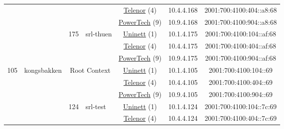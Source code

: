 \begin{small}
\begin{center}
\begin{longtable}{|c|c|c|c|c|c|c|c|}
  &  &  &  & \multicolumn{2}{|c|}{\tiny{\href{https://www.telenor.no}{Telenor} (4)}} & \tiny{10.4.4.168} & \tiny{2001:700:4100:404::a8:68} \\* \cline{5-5}\cline{6-6}\cline{7-7}\cline{8-8}
  &  &  &  & \multicolumn{2}{|c|}{\tiny{\href{http://www.powertech.no}{PowerTech} (9)}} & \tiny{10.9.4.168} & \tiny{2001:700:4100:904::a8:68} \\* \cline{3-3}\cline{4-4}\cline{5-5}\cline{6-6}\cline{7-7}\cline{8-8}
  &  & \multirow{3}{*}{\tiny{175}} & \multicolumn{1}{|l|}{\multirow{3}{*}{\tiny{srl-thuen}}} & \multicolumn{2}{|c|}{\tiny{\href{https://www.uninett.no}{Uninett} (1)}} & \tiny{10.1.4.175} & \tiny{2001:700:4100:104::af:68} \\* \cline{5-5}\cline{6-6}\cline{7-7}\cline{8-8}
  &  &  &  & \multicolumn{2}{|c|}{\tiny{\href{https://www.telenor.no}{Telenor} (4)}} & \tiny{10.4.4.175} & \tiny{2001:700:4100:404::af:68} \\* \cline{5-5}\cline{6-6}\cline{7-7}\cline{8-8}
  &  &  &  & \multicolumn{2}{|c|}{\tiny{\href{http://www.powertech.no}{PowerTech} (9)}} & \tiny{10.9.4.175} & \tiny{2001:700:4100:904::af:68} \\ \hline
 \multirow{21}{*}{\tiny{105}} & \multicolumn{1}{|l|}{\multirow{21}{*}{\tiny{kongsbakken}}} & \multicolumn{2}{|c|}{\multirow{3}{*}{\tiny{Root Context}}} & \multicolumn{2}{|c|}{\tiny{\href{https://www.uninett.no}{Uninett} (1)}} & \tiny{10.1.4.105} & \tiny{2001:700:4100:104::69} \\* \cline{5-5}\cline{6-6}\cline{7-7}\cline{8-8}
  &  & \multicolumn{2}{|c|}{} & \multicolumn{2}{|c|}{\tiny{\href{https://www.telenor.no}{Telenor} (4)}} & \tiny{10.4.4.105} & \tiny{2001:700:4100:404::69} \\* \cline{5-5}\cline{6-6}\cline{7-7}\cline{8-8}
  &  & \multicolumn{2}{|c|}{} & \multicolumn{2}{|c|}{\tiny{\href{http://www.powertech.no}{PowerTech} (9)}} & \tiny{10.9.4.105} & \tiny{2001:700:4100:904::69} \\* \cline{3-3}\cline{4-4}\cline{5-5}\cline{6-6}\cline{7-7}\cline{8-8}
  &  & \multirow{3}{*}{\tiny{124}} & \multicolumn{1}{|l|}{\multirow{3}{*}{\tiny{srl-test}}} & \multicolumn{2}{|c|}{\tiny{\href{https://www.uninett.no}{Uninett} (1)}} & \tiny{10.1.4.124} & \tiny{2001:700:4100:104::7c:69} \\* \cline{5-5}\cline{6-6}\cline{7-7}\cline{8-8}
  &  &  &  & \multicolumn{2}{|c|}{\tiny{\href{https://www.telenor.no}{Telenor} (4)}} & \tiny{10.4.4.124} & \tiny{2001:700:4100:404::7c:69} \\* \cline{5-5}\cline{6-6}\cline{7-7}\cline{8-8}

\end{longtable}
\end{center}
\end{small}
